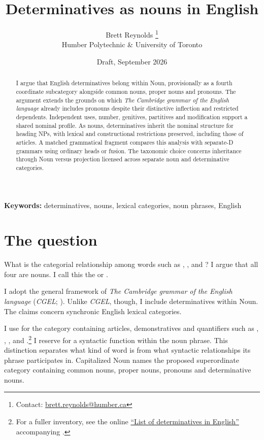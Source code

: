 \documentclass[12pt]{article}
\title{Determinatives as nouns in English}
\author{Brett Reynolds \orcidlink{0000-0003-0073-7195}%
\thanks{Contact: \href{mailto:brett.reynolds@humber.ca}{brett.reynolds@humber.ca}}\\
Humber Polytechnic \& University of Toronto}
\date{Draft, September 2026}
\begin{document}
\maketitle

\begin{abstract}
I argue that English determinatives belong within Noun, provisionally as a fourth coordinate subcategory alongside common nouns, proper nouns and pronouns. The argument extends the grounds on which \textit{The Cambridge grammar of the English language} already includes pronouns despite their distinctive inflection and restricted dependents. Independent uses, number, genitives, partitives and modification support a shared nominal profile. As nouns, determinatives inherit the nominal structure for heading NPs, with lexical and constructional restrictions preserved, including those of articles. A matched grammatical fragment compares this analysis with separate-D grammars using ordinary heads or fusion. The taxonomic choice concerns inheritance through Noun versus projection licensed across separate noun and determinative categories.
\end{abstract}

\noindent\textbf{Keywords:} determinatives, nouns, lexical categories, noun phrases, English

\section{The question}\label{sec:intro}

What is the categorial relationship among words such as , ,  and ? I argue that all four are nouns. I call this the  or .

I adopt the general framework of \textit{The Cambridge grammar of the English language} (\textit{CGEL}; \citealt{huddleston2002}). Unlike \textit{CGEL}, though, I include determinatives within Noun. The claims concern synchronic English lexical categories.

I use  for the category containing articles, demonstratives and quantifiers such as , , ,  and .\footnote{For a fuller inventory, see the online \href{https://www.cambridge.org/highereducation/api/resources/2AC8DF5CA558F8A6FCDFACD0EAF8EA08}{\enquote{List of determinatives in English}} accompanying \textcite{Huddleston2021}.} I reserve  for a syntactic function within the noun phrase. This distinction separates what kind of word  is from what syntactic relationships its phrase participates in. Capitalized Noun names the proposed superordinate category containing common nouns, proper nouns, pronouns and determinative nouns.
\end{document}
